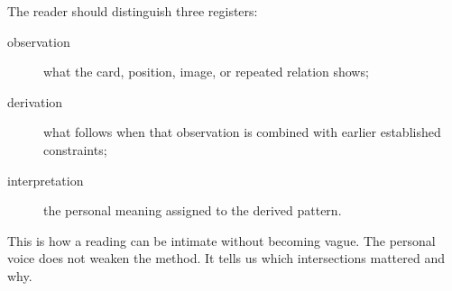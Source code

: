 The reader should distinguish three registers:

\begin{description}
\item[observation] what the card, position, image, or repeated relation shows;
\item[derivation] what follows when that observation is combined with earlier
      established constraints;
\item[interpretation] the personal meaning assigned to the derived pattern.
\end{description}

This is how a reading can be intimate without becoming vague. The personal
voice does not weaken the method. It tells us which intersections mattered and
why.
